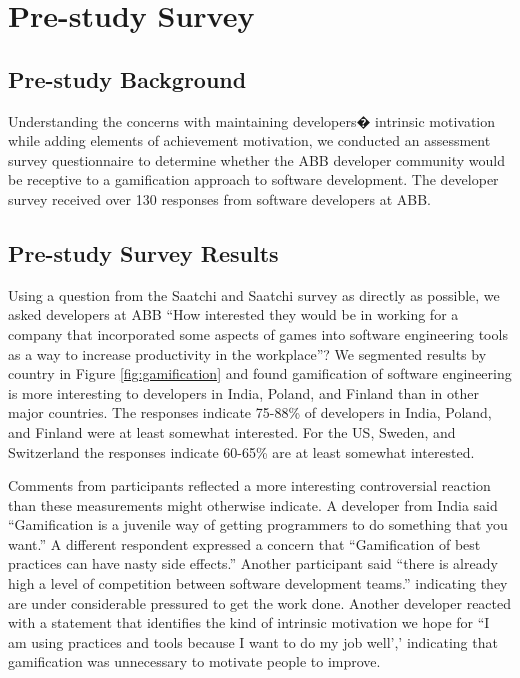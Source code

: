 \documentclass{sig-alternate}
\begin{document}
\section{Pre-study Survey}

\subsection{Pre-study Background}

Understanding the concerns with maintaining developers� intrinsic motivation while adding elements of achievement motivation, we conducted an assessment survey questionnaire to determine whether the ABB developer community would be receptive to a gamification approach to software development.  The developer survey received over 130 responses from software developers at ABB.

\subsection{Pre-study Survey Results}

Using a question from the Saatchi and Saatchi survey \cite{wbsnipes:SaatchiGameification} as directly as possible, we asked developers at ABB ``How interested they would be in working for a company that incorporated some aspects of games into software engineering tools as a way to increase productivity in the workplace''?  We segmented results by country in Figure \ref{fig:gamification} and found gamification of software engineering is more interesting to developers in India, Poland, and Finland than in other major countries.  The responses indicate 75-88\% of developers in India, Poland, and Finland were at least somewhat interested.  For the US, Sweden, and Switzerland the responses indicate 60-65\% are at least somewhat interested.  

Comments from participants reflected a more interesting controversial reaction than these measurements might otherwise indicate.  A developer from India said ``Gamification is a juvenile way of getting programmers to do something that you want.''  A different respondent expressed a concern that ``Gamification of best practices can have nasty side effects.''  Another participant said ``there is already high a level of competition between software development teams.'' indicating they are under considerable pressured to get the work done.  Another developer reacted with a statement that identifies the kind of intrinsic motivation we hope for ``I am using practices and tools because I want to do my job well',' indicating that gamification was unnecessary to motivate people to improve.
\end{document}
